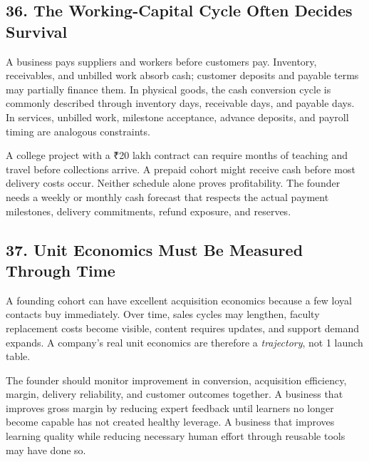 \subsection*{36. The Working-Capital Cycle Often Decides Survival}

A business pays suppliers and workers before customers pay. Inventory, receivables, and unbilled work absorb cash; customer deposits and payable terms may partially finance them. In physical goods, the cash conversion cycle is commonly described through inventory days, receivable days, and payable days. In services, unbilled work, milestone acceptance, advance deposits, and payroll timing are analogous constraints.

A college project with a ₹20 lakh contract can require months of teaching and travel before collections arrive. A prepaid cohort might receive cash before most delivery costs occur. Neither schedule alone proves profitability. The founder needs a weekly or monthly cash forecast that respects the actual payment milestones, delivery commitments, refund exposure, and reserves.

\subsection*{37. Unit Economics Must Be Measured Through Time}

A founding cohort can have excellent acquisition economics because a few loyal contacts buy immediately. Over time, sales cycles may lengthen, faculty replacement costs become visible, content requires updates, and support demand expands. A company's real unit economics are therefore a \emph{trajectory}, not 1 launch table.

The founder should monitor improvement in conversion, acquisition efficiency, margin, delivery reliability, and customer outcomes together. A business that improves gross margin by reducing expert feedback until learners no longer become capable has not created healthy leverage. A business that improves learning quality while reducing necessary human effort through reusable tools may have done so.
